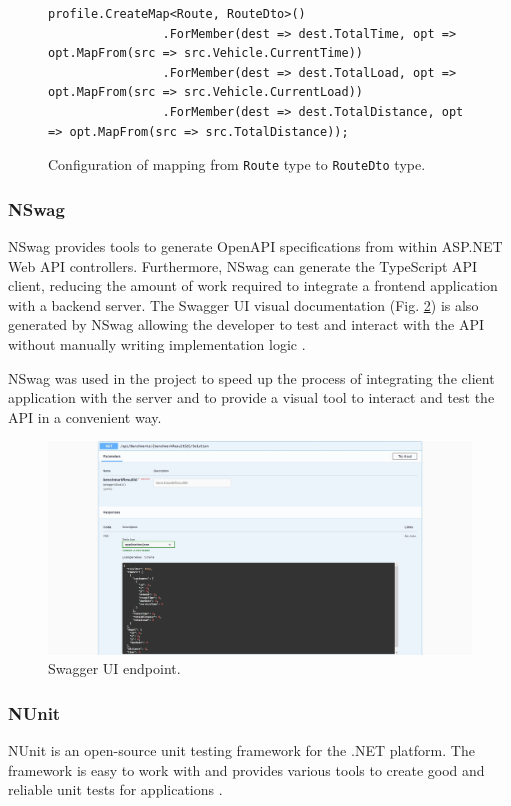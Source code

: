 \documentclass[a4paper,twoside,12pt]{book}
\begin{document}
\begin{figure}
\centering
\begin{lstlisting}
profile.CreateMap<Route, RouteDto>()
                .ForMember(dest => dest.TotalTime, opt => opt.MapFrom(src => src.Vehicle.CurrentTime))
                .ForMember(dest => dest.TotalLoad, opt => opt.MapFrom(src => src.Vehicle.CurrentLoad))
                .ForMember(dest => dest.TotalDistance, opt => opt.MapFrom(src => src.TotalDistance));
\end{lstlisting}
\caption{Configuration of mapping from \lstinline|Route| type to \lstinline|RouteDto| type.}
\label{fig:autoMapper}
\end{figure}

\subsubsection{NSwag}
NSwag provides tools to generate OpenAPI specifications from within ASP.NET Web API controllers. Furthermore, NSwag can generate the TypeScript API client, reducing the amount of work required to integrate a frontend application with a backend server. The Swagger UI visual documentation (Fig. \ref{fig:swaggerEndpoint}) is also generated by NSwag allowing the developer to test and interact with the API without manually writing implementation logic \cite{bib:NSwag}.  

NSwag was used in the project to speed up the process of integrating the client application with the server and to provide a visual tool to interact and test the API in a convenient way.

\begin{figure}[htbp]
\centering
\includegraphics[width=\textwidth]{images/swaggerUI.jpg}
\caption{Swagger UI endpoint.}
\label{fig:swaggerEndpoint}
\end{figure}

\subsubsection{NUnit}
NUnit is an open-source unit testing framework for the .NET platform. The framework is easy to work with and provides various tools to create good and reliable unit tests for applications \cite{bib:NUnit}.
\end{document}
